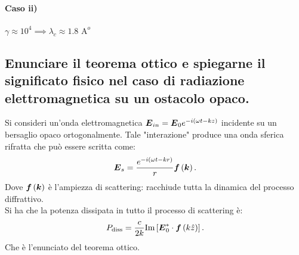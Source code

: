 \paragraph{Caso ii)}	$\gamma\approx 10^4 \implies \lambda_{c}\approx 1.8 \text{ A}^o $


\subsection[]{Enunciare il teorema ottico e spiegarne il significato fisico nel caso di radiazione elettromagnetica su un ostacolo opaco.}
\label{sec:3.b.25}
Si consideri un'onda elettromagnetica $\boldsymbol{E}_{in}= \boldsymbol{E}_{0}e^{-i\left( \omega t - kz \right) }$ incidente su un bersaglio opaco ortogonalmente. Tale "interazione" produce una onda sferica rifratta che può essere scritta come:
\[
	\boldsymbol{E}_s= \frac{e^{-i\left( \omega t - kr \right) }}{r}\boldsymbol{f}\left( \boldsymbol{k} \right) 
.\] 
Dove $\boldsymbol{f}\left( \boldsymbol{k} \right) $ è l'ampiezza di scattering: racchiude tutta la dinamica del processo diffrattivo.\\
Si ha che la potenza dissipata in tutto il processo di scattering è:
\[
	P_{\text{diss}}= \frac{c}{2k} \text{Im}\left[ \boldsymbol{E}^*_{0}\cdot \boldsymbol{f}\left( k \hat{z} \right)   \right] 
.\] 
Che è l'enunciato del teorema ottico.

